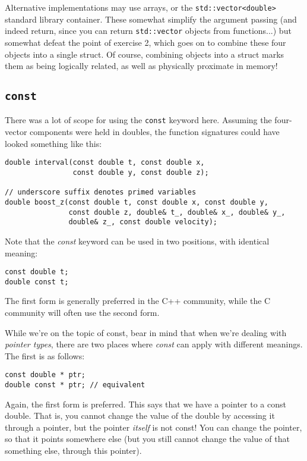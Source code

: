\documentclass[a4paper]{scrartcl}
\begin{document}
Alternative implementations may use arrays, or the \verb|std::vector<double>| standard library container. These somewhat simplify the argument passing (and indeed return, since you can return \verb|std::vector| objects from functions...) but somewhat defeat the point of exercise 2, which goes on to combine these four objects into a single struct. Of course, combining objects into a struct marks them as being logically related, as well as physically proximate in memory!

\subsection{\texttt{const}}
There was a lot of scope for using the \verb|const| keyword here. Assuming the four-vector components were held in doubles, the function signatures could have looked something like this:

\begin{verbatim}
double interval(const double t, const double x,
                const double y, const double z);

// underscore suffix denotes primed variables
double boost_z(const double t, const double x, const double y,
               const double z, double& t_, double& x_, double& y_,
               double& z_, const double velocity);
\end{verbatim}

Note that the \emph{const} keyword can be used in two positions, with identical meaning:

\begin{verbatim}
const double t;
double const t;
\end{verbatim}

The first form is generally preferred in the C++ community, while the C community will often use the second form.

While we're on the topic of const, bear in mind that when we're dealing with \emph{pointer types}, there are two places where \emph{const} can apply with different meanings. The first is as follows:

\begin{verbatim}
const double * ptr;
double const * ptr; // equivalent
\end{verbatim}

Again, the first form is preferred. This says that we have a pointer to a const double. That is, you cannot change the value of the double by accessing it through a pointer, but the pointer \emph{itself} is not const! You can change the pointer, so that it points somewhere else (but you still cannot change the value of that something else, through this pointer).
\end{document}
